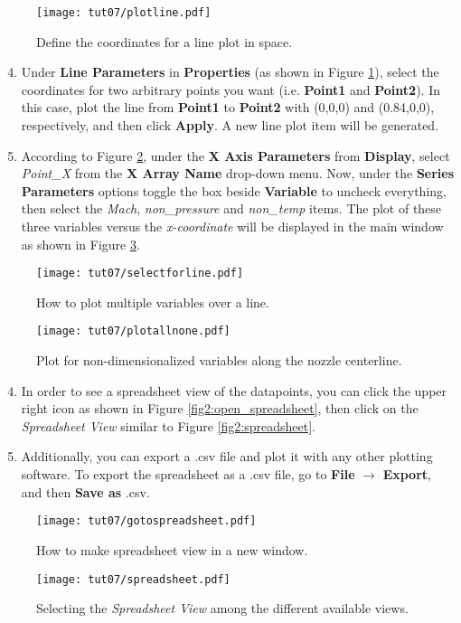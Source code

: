 \begin{figure}[ht]
	\centering
	\texttt{[image: tut07/plotline.pdf]}
	\caption{Define the coordinates for a line plot in space.}
	\label{fig7:line_coordinate}
\end{figure}
\begin{enumerate}[label=\arabic*)]
	\setcounter{enumi}{3}
	\item Under \textbf{Line Parameters} in \textbf{Properties} (as shown in Figure \ref{fig7:line_coordinate}), select the coordinates for two arbitrary points you want (i.e. \textbf{Point1} and \textbf{Point2}). In this case, plot the line from \textbf{Point1} to \textbf{Point2} with (0,0,0) and (0.84,0,0), respectively, and then click \textbf{Apply}. A new line plot item will be generated.
	\item  According to Figure \ref{fig7:plot3nonvar}, under the \textbf{X Axis Parameters} from \textbf{Display}, select \textit{Point\_X} from the \textbf{X Array Name} drop-down menu. Now, under the \textbf{Series Parameters} options toggle the box beside \textbf{Variable} to uncheck everything, then select the \textit{Mach}, \textit{non\_pressure} and \textit{non\_temp} items. The plot of these three variables versus the \textit{x-coordinate} will be displayed in the main window as shown in Figure \ref{fig7:plot_line}.
\end{enumerate}
\begin{figure}[H]
	\centering
	\texttt{[image: tut07/selectforline.pdf]}
	\caption{How to plot multiple variables over a line.}
	\label{fig7:plot3nonvar}
\end{figure}
\begin{figure}[ht]
	\centering
	\texttt{[image: tut07/plotallnone.pdf]}
	\caption{Plot for non-dimensionalized variables along the nozzle centerline.}
	\label{fig7:plot_line}
\end{figure}
\begin{enumerate}[label=\arabic*)]
	\setcounter{enumi}{3}
	\item In order to see a spreadsheet view of the datapoints, you can click the upper right icon as shown in Figure \ref{fig2:open_spreadsheet}, then click on the \textit{Spreadsheet View} similar to Figure \ref{fig2:spreadsheet}.
	\item Additionally, you can export a .csv file and plot it with any other plotting software. To export the spreadsheet as a .csv file, go to \textbf{File} $\rightarrow$ \textbf{Export}, and then \textbf{Save as} .csv.
\end{enumerate}
\begin{figure}[ht]
	\centering
	\texttt{[image: tut07/gotospreadsheet.pdf]}
	\caption{How to make spreadsheet view in a new window.}
	\label{fig7:open_spreadsheet}
\end{figure}
\begin{figure}[H]
	\centering
	\texttt{[image: tut07/spreadsheet.pdf]}
	\caption{Selecting the \textit{Spreadsheet View} among the different available views.}
	\label{fig7:spreadsheet}
\end{figure}
